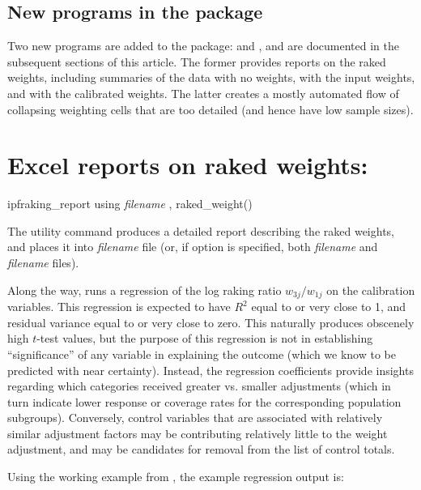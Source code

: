 \subsection{New programs in the package}

Two new programs are added to the package:  and ,
and are documented in the subsequent sections of this article. The former provides reports on the raked weights,
including summaries of the data with no weights, with the input weights, and with the calibrated weights.
The latter creates a mostly automated flow of collapsing weighting cells that are too detailed
(and hence have low sample sizes).

\section{Excel reports on raked weights:  }

\begin{stsyntax}
ipfraking\_report
using \textit{filename}
,
raked\_weight(\varname)
\end{stsyntax}

The utility command  produces a detailed report
describing the raked weights, and places it into \textit{filename} file
(or, if  option is specified, both \textit{filename} and \textit{filename}
files).

Along the way,  runs a regression of the log raking ratio $w_{3j}/w_{1j}$
on the calibration variables. This regression is expected to have $R^2$ equal to or very close to 1,
and residual variance equal to or very close to zero. This naturally produces obscenely
high $t$-test values, but the purpose of this regression is not in establishing
``significance'' of any variable in explaining the outcome (which we know to be predicted
with near certainty).
Instead, the regression coefficients provide insights regarding which categories received
greater vs. smaller adjustments (which in turn indicate lower response or coverage rates
for the corresponding population subgroups). Conversely, control variables that are
associated with relatively similar adjustment factors may be contributing relatively
little to the weight adjustment, and may be candidates for removal from the list of control totals.

Using the working example from \citet{kolenikov:2014}, the example regression output is:

